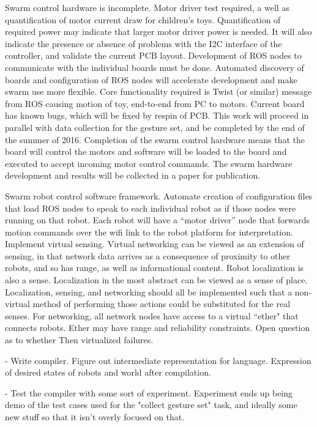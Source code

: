 \documentclass[]{article}
\begin{document}
Swarm control hardware is incomplete. 
Motor driver test required, a well as quantification of motor current draw for children's toys. 
Quantification of required power may indicate that larger motor driver power is needed.
It will also indicate the presence or absence of problems with the I2C interface of the controller, and validate the current PCB layout. 
Development of ROS nodes to communicate with the individual boards must be done. 
Automated discovery of boards and configuration of ROS nodes will accelerate development and make swarm use more flexible. 
Core functionality required is Twist (or similar) message from ROS causing motion of toy, end-to-end from PC to motors. 
Current board has known bugs, which will be fixed by respin of PCB. 
This work will proceed in parallel with data collection for the gesture set, and be completed by the end of the summer of 2016.
Completion of the swarm control hardware means that the board will control the motors and software will be loaded to the board and executed to accept incoming motor control commands.
The swarm hardware development and results will be collected in a paper for publication.  

Swarm robot control software framework. 
Automate creation of configuration files that load ROS nodes to speak to each individual robot as if those nodes were running on that robot. 
Each robot will have a ``motor driver'' node that forwards motion commands over the wifi link to the robot platform for interpretation. 
Implement virtual sensing. 
Virtual networking can be viewed as an extension of sensing, in that network data arrives as a consequence of proximity to other robots, and so has range, as well as informational content. 
Robot localization is also a sense. 
Localization in the most abstract can be viewed as a sense of place. 
Localization, sensing, and networking should all be implemented such that a non-virtual method of performing those actions could be substituted for the real senses.
For networking, all network nodes have access to a virtual ``ether" that connects robots. 
Ether may have range and reliability constraints. 
Open question as to whether
Then virtualized failures. 
 
 - Write compiler. Figure out intermediate representation for language. Expression of desired states of robots and world after compilation.  
 
 - Test the compiler with some sort of experiment. Experiment ends up being demo of the test cases used for the "collect gesture set" task, and ideally some new stuff so that it isn't overly focused on that.  
\end{document}
